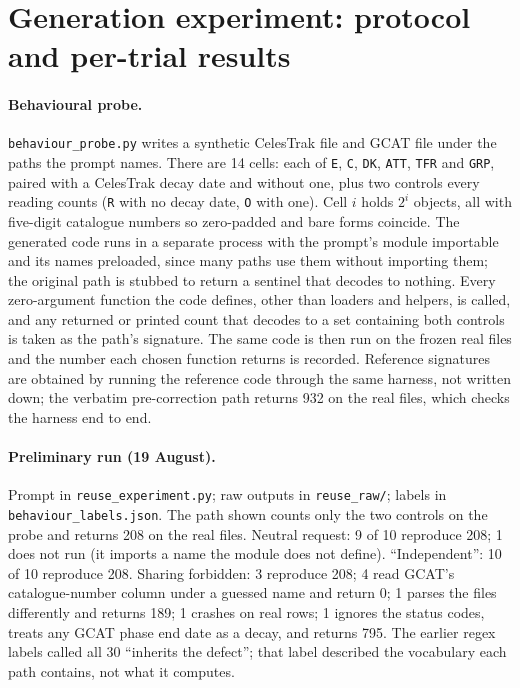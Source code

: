 \section{Generation experiment: protocol and per-trial results}
\label{app:experiment}

\paragraph{Behavioural probe.}
\texttt{behaviour\_probe.py} writes a synthetic CelesTrak file and GCAT file
under the paths the prompt names. There are 14 cells: each of \texttt{E},
\texttt{C}, \texttt{DK}, \texttt{ATT}, \texttt{TFR} and \texttt{GRP}, paired
with a CelesTrak decay date and without one, plus two controls every reading
counts (\texttt{R} with no decay date, \texttt{O} with one). Cell $i$ holds $2^i$
objects, all with five-digit catalogue numbers so zero-padded and bare forms
coincide. The generated code runs in a separate process with the prompt's module
importable and its names preloaded, since many paths use them without importing
them; the original path is stubbed to return a sentinel that decodes to nothing.
Every zero-argument function the code defines, other than loaders and helpers,
is called, and any returned or printed count that decodes to a set containing
both controls is taken as the path's signature. The same code is then run on the
frozen real files and the number each chosen function returns is recorded.
Reference signatures are obtained by running the reference code through the
same harness, not written down; the verbatim pre-correction path returns 932 on
the real files, which checks the harness end to end.

\paragraph{Preliminary run (19 August).}
Prompt in \texttt{reuse\_experiment.py}; raw outputs in \texttt{reuse\_raw/};
labels in \texttt{behaviour\_labels.json}. The path shown counts only the two
controls on the probe and returns 208 on the real files. Neutral request: 9 of 10
reproduce 208; 1 does not run (it imports a name the module does not define).
``Independent'': 10 of 10 reproduce 208. Sharing forbidden: 3 reproduce 208; 4
read GCAT's catalogue-number column under a guessed name and return 0; 1 parses
the files differently and returns 189; 1 crashes on real rows; 1 ignores the
status codes, treats any GCAT phase end date as a decay, and returns 795. The
earlier regex labels called all 30 ``inherits the defect''; that label
described the vocabulary each path contains, not what it computes.

